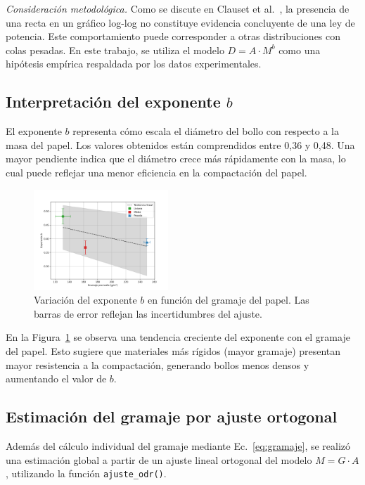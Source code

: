 \documentclass[12pt,a4]{article}
\begin{document}
\textit{Consideración metodológica.} Como se discute en Clauset et al.~\cite{clauset}, la presencia de una recta en un gráfico log-log no constituye evidencia concluyente de una ley de potencia. Este comportamiento puede corresponder a otras distribuciones con colas pesadas. En este trabajo, se utiliza el modelo \( D = A \cdot M^b \) como una hipótesis empírica respaldada por los datos experimentales.

\subsection{Interpretación del exponente \( b \)}

El exponente \( b \) representa cómo escala el diámetro del bollo con respecto a la masa del papel. Los valores obtenidos están comprendidos entre 0,36 y 0,48. Una mayor pendiente indica que el diámetro crece más rápidamente con la masa, lo cual puede reflejar una menor eficiencia en la compactación del papel.

\begin{figure}[H]
    \centering
    \includegraphics[width=0.45\textwidth]{b_vs_gramaje.png}
    \caption{Variación del exponente \( b \) en función del gramaje del papel. Las barras de error reflejan las incertidumbres del ajuste.}
    \label{fig:b_vs_gramaje}
\end{figure}

En la Figura~\ref{fig:b_vs_gramaje} se observa una tendencia creciente del exponente con el gramaje del papel. Esto sugiere que materiales más rígidos (mayor gramaje) presentan mayor resistencia a la compactación, generando bollos menos densos y aumentando el valor de \( b \).

\subsection{Estimación del gramaje por ajuste ortogonal}

Además del cálculo individual del gramaje mediante Ec.~\eqref{eq:gramaje}, se realizó una estimación global a partir de un ajuste lineal ortogonal del modelo \( M = G \cdot A \), utilizando la función \texttt{ajuste\_odr()}.
\end{document}
